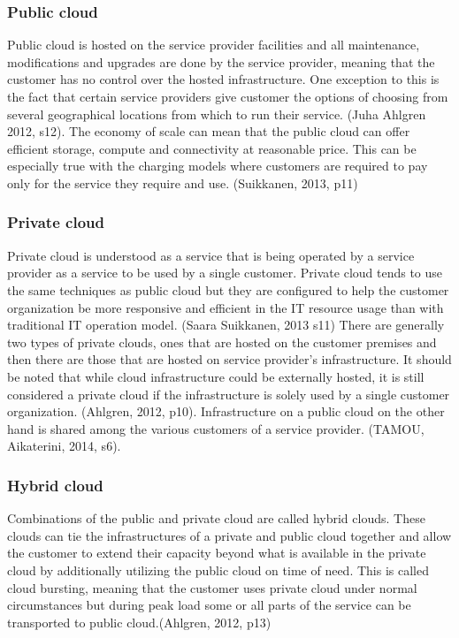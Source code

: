 \documentclass{article}
\begin{document}
\subsubsection{Public cloud}
Public cloud is hosted on the service provider facilities and all maintenance, modifications and upgrades are done by the service provider, meaning that the customer has no control over the hosted infrastructure. One exception to this is the fact that certain service providers give customer the options of choosing from several geographical locations from which to run their service. (Juha Ahlgren 2012, s12).
The economy of scale can mean that the public cloud can offer efficient storage, compute and connectivity at reasonable price. This can be especially true with the charging models where customers are required to pay only for the service they require and use. (Suikkanen, 2013, p11)
\subsubsection{Private cloud}
Private cloud is understood as a service that is being operated by a service provider as a service to be used by a single customer. Private cloud tends to use the same techniques as public cloud but they are configured to help the customer organization be more responsive and efficient in the IT resource usage than with traditional IT operation model. (Saara Suikkanen, 2013 s11)
There are generally two types of private clouds, ones that are hosted on the customer premises and then there are those that are hosted on service provider's infrastructure. It should be noted that while cloud infrastructure could be externally hosted, it is still considered a private cloud if the infrastructure is solely used by a single customer organization. (Ahlgren, 2012, p10).
Infrastructure on a public cloud on the other hand is shared among the various customers of a service provider. (TAMOU, Aikaterini, 2014, s6).
\subsubsection{Hybrid cloud}
Combinations of the public and private cloud are called hybrid clouds. These clouds can tie the infrastructures of a private and public cloud together and allow the customer to extend their capacity beyond what is available in the private cloud by additionally utilizing the public cloud on time of need. This is called cloud bursting, meaning that the customer uses private cloud under normal circumstances but during peak load some or all parts of the service can be transported to public cloud.(Ahlgren, 2012, p13)
\end{document}
